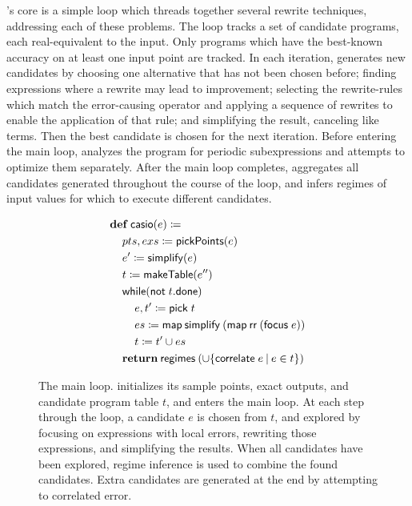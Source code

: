 \documentclass[paper.tex]{subfiles}
\begin{document}
\casio's core is a simple loop
  which threads together several rewrite techniques,
  addressing each of these problems.
The loop tracks a set of candidate programs,
  each real-equivalent to the input.
Only programs which have the best-known accuracy
  on at least one input point are tracked.
In each iteration, \casio generates new candidates
  by choosing one alternative that has not been chosen before;
  finding expressions where a rewrite may lead to improvement;
  selecting the rewrite-rules which match the error-causing operator
  and applying a sequence of rewrites to enable the application of that rule;
  and simplifying the result, canceling like terms.
Then the best candidate is chosen for the next iteration.
Before entering the main loop,
  \casio analyzes the program for periodic subexpressions
  and attempts to optimize them separately.
After the main loop completes,
  \casio aggregates all candidates generated
  throughout the course of the loop,
  and infers regimes of input values for which
  to execute different candidates.

\begin{figure}
\begin{footnotesize}
\begin{align*}
  &\!def!\:\mathsf{casio}(e) \ceq \\
  &\> pts, exs \ceq \mathsf{pickPoints}(e) \\
  &\> e' \ceq \mathsf{simplify}(e) \\
  &\> t \ceq \mathsf{makeTable}(e'') \\
  &\> \mathsf{while}(\mathsf{not} \; t.\mathsf{done}) \\
  &\> \> e, t' \ceq \mathsf{pick}\;t \\
  &\> \> es \ceq \mathsf{map}\:\mathsf{simplify}\:(\mathsf{map}\:\mathsf{rr}\:(\mathsf{focus}\;e)) \\
  &\> \> t \ceq t' \cup es \\
  &\> \!return!\:\mathsf{regimes}\:(\cup\{\mathsf{correlate}\;e \I e \in t \})
\end{align*}
\end{footnotesize}
\caption{The \casio main loop.
  \casio initializes its sample points, exact outputs,
    and candidate program table $t$, and enters the main loop.
  At each step through the loop, a candidate $e$ is chosen from $t$,
    and explored by focusing on expressions with local errors,
    rewriting those expressions, and simplifying the results.
  When all candidates have been explored,
    regime inference is used to combine the found candidates.
  Extra candidates are generated at the end by attempting to correlated error.}
\label{alg:main}
\end{figure}
\end{document}

